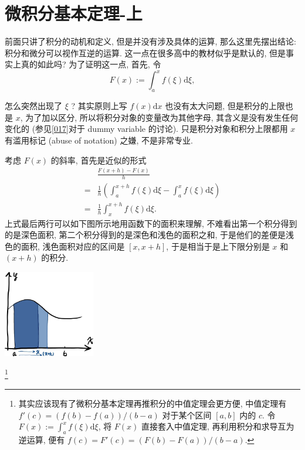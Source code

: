 \section{微积分基本定理-上}\label{018}

\begin{tcolorbox}[size=fbox, breakable, enhanced jigsaw, title={微积分基本定理 (fundamental theorem of calculus)}]

前面只讲了积分的动机和定义, 但是并没有涉及具体的运算,
那么这里先摆出结论: 积分和微分可以视作互逆的运算.
这一点在很多高中的教材似乎是默认的, 但是事实上真的如此吗?
为了证明这一点, 首先, 令 \[
F(x):=\int_a^xf(\xi)\mathrm{d}\xi,
\]

\begin{newquote}
怎么突然出现了 \(\xi\) ? 其实原则上写 \(f(x)\mathrm{d}x\)
也没有太大问题, 但是积分的上限也是 \(x\), 为了加以区分,
所以将积分对象的变量改为其他字母, 其含义是没有发生任何变化的
(参见\ref{017}对于 dummy variable 的讨论). 只是积分对象和积分上限都用
\(x\) 有滥用标记 (abuse of notation) 之嫌, 不是非常专业.
\end{newquote}

考虑 \(F(x)\) 的斜率, 首先是近似的形式 \[
\begin{aligned}
&\frac{F(x+h)-F(x)}{h}\\
=&\frac{1}{h}\left(\int_a^{x+h}f(\xi)\mathrm{d}\xi-\int_a^xf(\xi)\mathrm{d}\xi\right)\\
=&\frac{1}{h}\int_x^{x+h}f(\xi)\mathrm{d}\xi.
\end{aligned}
\] 上式最后两行可以如下图所示地用函数下的面积来理解,
不难看出第一个积分得到的是深色面积,
第二个积分得到的是深色和浅色的面积之和, 于是他们的差便是浅色的面积,
浅色面积对应的区间是 \([x,x+h]\), 于是相当于是上下限分别是 \(x\) 和
\((x+h)\) 的积分.

\begin{tcolorbox}[size=fbox, breakable, enhanced jigsaw]
\includegraphics[width=0.3\textwidth]{img/image-20230912145204089.png}

\end{tcolorbox}

\begin{tcolorbox}[size=fbox, breakable, enhanced jigsaw, title={插曲: 定积分的中值定理}]\footnote{其实应该现有了微积分基本定理再推积分的中值定理会更方便,
  中值定理有 \(f'(c)=(f(b)-f(a))/(b-a)\) 对于某个区间 \([a,b]\) 内的
  \(c\). 令 \(F(x):=\int_a^xf(\xi)\mathrm{d}\xi\), 将 \(F(x)\)
  直接套入中值定理, 再利用积分和求导互为逆运算, 便有
  \(f(c)=F'(c)=(F(b)-F(a))/(b-a)\).}


\end{tcolorbox}
\end{tcolorbox}
